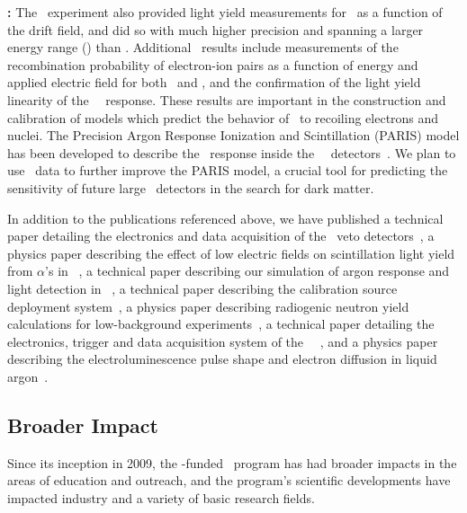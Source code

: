 \begin{compactitem}
\item {\bf \ARIS:} The \ARIS\ experiment also provided light yield measurements for \NRs\ as a function of the drift field, and did so with much higher precision and spanning a larger energy range (\ARISRecoilsLightEnergyRange) than \SCENE.  Additional \ARIS\ results include measurements of the recombination probability of electron-ion pairs as a function of energy and applied electric field for both \ERs\ and \NRs, and the confirmation of the light yield linearity of the \LAr\ \ER\ response. These results are important in the construction and calibration of models which predict the behavior of \LAr\ to recoiling electrons and nuclei. The Precision Argon Response Ionization and Scintillation (PARIS) model has been developed to describe the \LAr\ response inside the \DS\ \LArTPC\ detectors~\cite{Agnes:2017cz}. We plan to use \ARIS\ data to further improve the PARIS model, a crucial tool for predicting the sensitivity of future large \LAr\ detectors in the search for dark matter.

\end{compactitem}

In addition to the publications referenced above, we have published a technical paper detailing the electronics and data acquisition of the \DSfs\ veto detectors~\cite{Agnes:2016cp}, a physics paper describing the effect of low electric fields on scintillation light yield from $\alpha$'s in \LAr~\cite{Agnes:2017cl}, a technical paper describing our simulation of argon response and light detection in \DSfs~\cite{Agnes:2017cz}, a technical paper describing the calibration source deployment system~\cite{Agnes:2017ec}, a physics paper describing radiogenic neutron yield calculations for low-background experiments~\cite{Westerdale:2017vr}, a technical paper detailing the electronics, trigger and data acquisition system of the \DSfs\ \LArTPC~\cite{Agnes:2017ck}, and a physics paper describing the electroluminescence pulse shape and electron diffusion in liquid argon~\cite{Agnes:2018dt}.

\subsection{Broader Impact}
\label{sec:PreviousResults-BroaderImpact}

Since its inception in 2009, the \NSF-funded \DSs\ program has had broader impacts in the areas of education and outreach, and the program's scientific developments have impacted industry and a variety of basic research fields.

